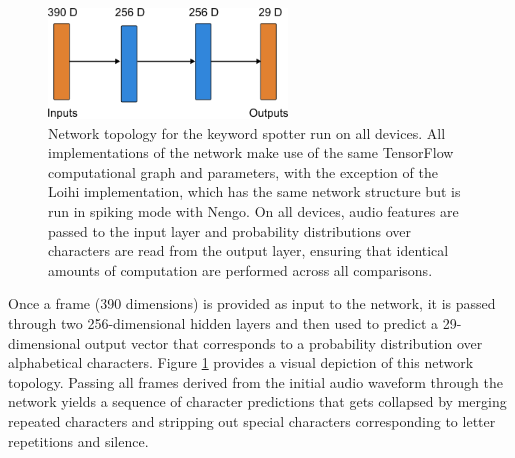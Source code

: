 \documentclass{article}
\begin{document}
\begin{figure}[ht!]
\centering
    \includegraphics[width=2.5in]{./figures/network.png}
    \caption{Network topology for the keyword spotter run on all devices. All implementations of the network make use of the same TensorFlow computational graph and parameters, with the exception of the Loihi implementation, which has the same network structure but is run in spiking mode with Nengo. On all devices, audio features are passed to the input layer and probability distributions over characters are read from the output layer, ensuring that identical amounts of computation are performed across all comparisons.}
\label{network_fig}
\end{figure}

Once a frame (390 dimensions) is provided as input to the network, it is passed through two 256-dimensional hidden layers and then used to predict a 29-dimensional output vector that corresponds to a probability distribution over alphabetical characters. Figure \ref{network_fig} provides a visual depiction of this network topology. Passing all frames derived from the initial audio waveform through the network yields a sequence of character predictions that gets collapsed by merging repeated characters and stripping out special characters corresponding to letter repetitions and silence. 
\end{document}
